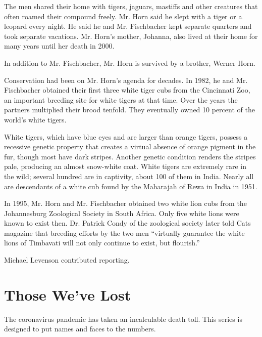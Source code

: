 The men shared their home with tigers, jaguars, mastiffs and other
creatures that often roamed their compound freely. Mr. Horn said he
slept with a tiger or a leopard every night. He said he and Mr.
Fischbacher kept separate quarters and took separate vacations. Mr.
Horn's mother, Johanna, also lived at their home for many years until
her death in 2000.

In addition to Mr. Fischbacher, Mr. Horn is survived by a brother,
Werner Horn.

Conservation had been on Mr. Horn's agenda for decades. In 1982, he and
Mr. Fischbacher obtained their first three white tiger cubs from the
Cincinnati Zoo, an important breeding site for white tigers at that
time. Over the years the partners multiplied their brood tenfold. They
eventually owned 10 percent of the world's white tigers.

White tigers, which have blue eyes and are larger than orange tigers,
possess a recessive genetic property that creates a virtual absence of
orange pigment in the fur, though most have dark stripes. Another
genetic condition renders the stripes pale, producing an almost
snow-white coat. White tigers are extremely rare in the wild; several
hundred are in captivity, about 100 of them in India. Nearly all are
descendants of a white cub found by the Maharajah of Rewa in India in
1951.

In 1995, Mr. Horn and Mr. Fischbacher obtained two white lion cubs from
the Johannesburg Zoological Society in South Africa. Only five white
lions were known to exist then. Dr. Patrick Condy of the zoological
society later told Cats magazine that breeding efforts by the two men
``virtually guarantee the white lions of Timbavati will not only
continue to exist, but flourish.''

Michael Levenson contributed reporting.

\href{https://www.nytimes.com/interactive/2020/obituaries/people-died-coronavirus-obituaries.html?action=click\&pgtype=Article\&state=default\&region=BELOW_MAIN_CONTENT\&context=covid_obits_promo}{}

\hypertarget{those-weve-lost}{%
\section{Those We've Lost}\label{those-weve-lost}}

The coronavirus pandemic has taken an incalculable death toll. This
series is designed to put names and faces to the numbers.

